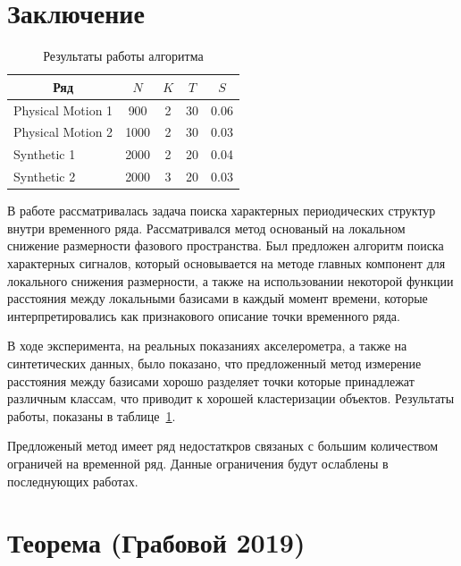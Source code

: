 \documentclass[12pt, twoside]{article}
\numberwithin{equation}{section}
\begin{document}
\section{Заключение}
\begin{table}[h]
\begin{center}
\caption{Результаты работы алгоритма}
\label{table_2}
\begin{tabular}{|c|c|c|c|c|}
\hline
	Ряд & $N$& $K$& $T$& $S$\\
	\hline
	\multicolumn{1}{|l|}{Physical Motion 1}
	& 900& 2& 30& 0.06\\
	\hline
	\multicolumn{1}{|l|}{Physical Motion 2}
	& 1000& 2& 30& 0.03\\
	\hline
	\multicolumn{1}{|l|}{Synthetic 1}
	& 2000& 2& 20& 0.04\\
	\hline
	\multicolumn{1}{|l|}{Synthetic 2}
	& 2000& 3& 20& 0.03\\
\hline

\end{tabular}
\end{center}
\end{table}

В работе рассматривалась задача поиска характерных периодических структур внутри временного ряда. Рассматривался метод основаный на локальном снижение размерности фазового пространства. Был предложен алгоритм поиска характерных сигналов, который основывается на методе главных компонент для локального снижения размерности, а также на использовании некоторой функции расстояния между локальными базисами в каждый момент времени, которые интерпретировались как признакового описание точки временного ряда.

В ходе эксперимента, на реальных показаниях акселерометра, а также на синтетических данных, было показано, что предложенный метод измерение расстояния между базисами хорошо разделяет точки которые принадлежат различным классам, что приводит к хорошей кластеризации объектов. Результаты работы, показаны в таблице~\ref{table_2}.

Предложеный метод имеет ряд недостаткров связаных с большим количеством ограничей на временной ряд. Данные ограничения будут ослаблены в последнующих работах.



\appendix
\section{Теорема (Грабовой 2019)}\label{ProofTheorem1}
\end{document}

